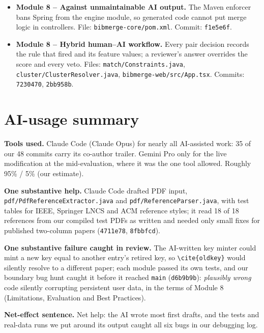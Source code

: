 \documentclass[11pt,a4paper]{article}
\begin{document}
\begin{itemize}[leftmargin=*,nosep]
        and build) on every PR, and a \texttt{Co-Authored-By} trailer on every
        AI-assisted commit.  File: \texttt{.github/workflows/ci.yml}.
        Commits: \texttt{f1e5e6f}, \texttt{639c999} (PR integration).
  \item \textbf{Module 8 -- Against unmaintainable AI output.}  The Maven
        enforcer bans Spring from the engine module, so generated code cannot
        put merge logic in controllers.  File: \texttt{bibmerge-core/pom.xml}.
        Commit: \texttt{f1e5e6f}.
  \item \textbf{Module 8 -- Hybrid human--AI workflow.}
        Every pair decision records the rule that fired and its feature values;
        a reviewer's answer overrides the score and every veto.  Files:
        \texttt{match/Constraints.java}, \texttt{cluster/ClusterResolver.java},
        \texttt{bibmerge-web/src/App.tsx}.  Commits: \texttt{7230470}, \texttt{2bb958b}.
\end{itemize}

\section{AI-usage summary}

\textbf{Tools used.}
Claude Code (Claude Opus) for nearly all AI-assisted work: 35 of our 48
commits carry its co-author trailer.  Gemini Pro only for the live
modification at the mid-evaluation, where it was the one tool allowed.
Roughly 95\% / 5\% (our estimate).

\textbf{One substantive help.}
Claude Code drafted PDF input, \texttt{pdf/PdfReferenceExtractor.java} and
\texttt{pdf/ReferenceParser.java}, with test tables for IEEE, Springer LNCS and ACM reference styles; it read
18 of 18 references from our compiled test PDFs as written and needed only
small fixes for published two-column papers (\texttt{4711e78}, \texttt{8fbbfcd}).

\textbf{One substantive failure caught in review.}
The AI-written key minter could mint a new key equal to another entry's
retired key, so \verb|\cite{oldkey}| would silently resolve to a different
paper; each module passed its own tests, and our boundary bug hunt caught it
before it reached \texttt{main} (\texttt{d6b9b9b}): \emph{plausibly wrong} code
silently corrupting persistent user data, in the terms of Module 8
(Limitations, Evaluation and Best Practices).

\textbf{Net-effect sentence.}
Net help: the AI wrote most first drafts, and the tests and real-data runs
we put around its output caught all six bugs in our debugging log.
\end{document}
